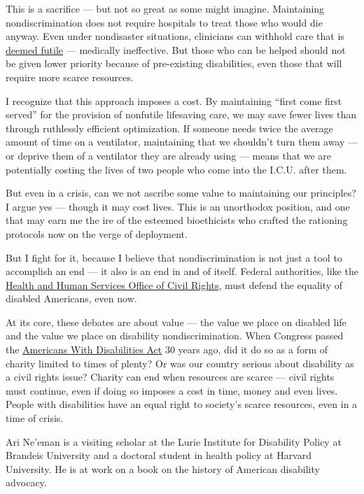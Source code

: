 This is a sacrifice --- but not so great as some might imagine.
Maintaining nondiscrimination does not require hospitals to treat those
who would die anyway. Even under nondisaster situations, clinicians can
withhold care that is
\href{https://depts.washington.edu/bhdept/ethics-medicine/bioethics-topics/detail/65}{deemed
futile} --- medically ineffective. But those who can be helped should
not be given lower priority because of pre-existing disabilities, even
those that will require more scarce resources.

I recognize that this approach imposes a cost. By maintaining ``first
come first served'' for the provision of nonfutile lifesaving care, we
may save fewer lives than through ruthlessly efficient optimization. If
someone needs twice the average amount of time on a ventilator,
maintaining that we shouldn't turn them away --- or deprive them of a
ventilator they are already using --- means that we are potentially
costing the lives of two people who come into the I.C.U. after them.

But even in a crisis, can we not ascribe some value to maintaining our
principles? I argue yes --- though it may cost lives. This is an
unorthodox position, and one that may earn me the ire of the esteemed
bioethicists who crafted the rationing protocols now on the verge of
deployment.

But I fight for it, because I believe that nondiscrimination is not just
a tool to accomplish an end --- it also is an end in and of itself.
Federal authorities, like the
\href{https://www.hhs.gov/ocr/index.html}{Health and Human Services
Office of Civil Rights}, must defend the equality of disabled Americans,
even now.

At its core, these debates are about value --- the value we place on
disabled life and the value we place on disability nondiscrimination.
When Congress passed the \href{https://www.ada.gov/}{Americans With
Disabilities Act} 30 years ago, did it do so as a form of charity
limited to times of plenty? Or was our country serious about disability
as a civil rights issue? Charity can end when resources are scarce ---
civil rights must continue, even if doing so imposes a cost in time,
money and even lives. People with disabilities have an equal right to
society's scarce resources, even in a time of crisis.

Ari Ne'eman is a visiting scholar at the Lurie Institute for Disability
Policy at Brandeis University and a doctoral student in health policy at
Harvard University. He is at work on a book on the history of American
disability advocacy.

